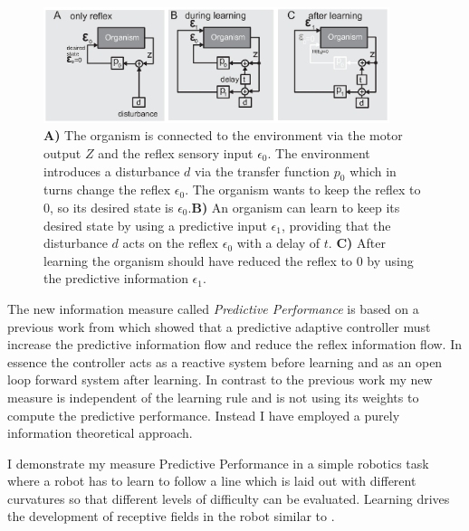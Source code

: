 \begin{figure}[!hbt]
	\begin{center}
		\includegraphics[width=0.9\textwidth]{figures/ppmeasure/1}
	\end{center}
	\caption[Information flow in the adaptive controller]{ 
	  {\bf A)} The organism is connected to the
          environment via the motor output $Z$ and the reflex sensory
          input $\epsilon_{0}$. The environment introduces a disturbance $d$
          via the transfer function $p_0$ which in turns change the
          reflex $\epsilon_{0}$. The organism wants to keep the reflex to 0, so
          its desired state is $\epsilon_{0}$.{\bf B)} An organism can learn to
          keep its desired state by using a predictive input $\epsilon_{1}$,
          providing that the disturbance $d$ acts on the reflex $\epsilon_{0}$
          with a delay of $t$. {\bf C)} After learning the organism
          should have reduced the reflex to 0 by using the predictive
          information $\epsilon_{1}$.  
	  \label{PPmeasure:Figure1}}
\end{figure}
 


The new information measure called 
\textsl{Predictive Performance} is based on a previous work from
\citet{Porr2005kyb} which showed
that a predictive adaptive controller must increase the predictive
information flow and reduce the reflex information flow.
In essence the controller acts as a reactive system before learning and as an
open loop forward system after learning. In contrast to the
previous work my new measure is independent of the learning
rule and is not using its weights to compute the predictive
performance. Instead I have employed a purely information theoretical
approach.

I demonstrate my measure Predictive Performance in a simple
robotics task where a robot has to learn to follow a line which is laid
out with different curvatures so that different levels of difficulty
can be evaluated. Learning drives the development of receptive
fields in the robot similar to \citet{Kulvicius2007:RFrobot}. 
 
